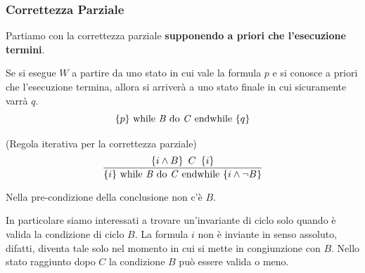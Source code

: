 			\subsubsection{Correttezza Parziale}
			Partiamo con la correttezza parziale \textbf{supponendo a priori che l'esecuzione
			termini}. 
			\begin{definizione}
			    Se si esegue $W$ a partire da uno stato in cui vale la formula $p$ e si conosce a priori che l'esecuzione termina, allora si arriverà a uno stato finale in cui sicuramente varrà $q$.
			   	\[\{p\}\mbox{ while \textit{B} do \textit{C} endwhile }\{q\}\]
			 \end{definizione}
			 \begin{definizione}(Regola iterativa per la correttezza parziale)
			 			\begin{align}\label{IterationRulePartial}
				\frac{\{i\land B\}\,\,\, C\,\,\,\{i\}}{\{i\}\mbox{ while \textit{B} do 
				\textit{C} endwhile }\{i\land \neg B\}}                               
			\end{align}

						\begin{nota}
			Nella pre-condizione della conclusione non c'è $B$.
			\end{nota}
			\end{definizione}
			
			In particolare siamo interessati a trovare un'invariante di ciclo solo quando è valida la condizione di ciclo $B$. La formula $i$ non è inviante in senso assoluto, difatti, diventa tale solo nel momento in cui si mette in congiunzione con $B$. Nello stato raggiunto
			dopo $C$ la condizione $B$ può essere valida o meno. 
			
